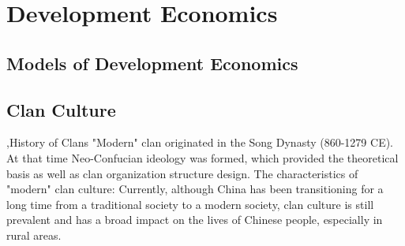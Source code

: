 \documentclass[12pt]{report}
\begin{document}
\clearpage
\section{Development Economics}

\subsection{Models of Development Economics}

\subsection{Clan Culture}

\sep{History of Clans}
"Modern" clan originated in the Song Dynasty (860-1279 CE). At that time Neo-Confucian ideology was formed,
which provided the theoretical basis as well as clan organization structure design. The characteristics
of "modern" clan culture:
Currently, although China has been transitioning for a long time from a traditional society to a modern society, clan culture is still
prevalent and has a broad impact on the lives of Chinese people, especially in rural areas.
\end{document}
